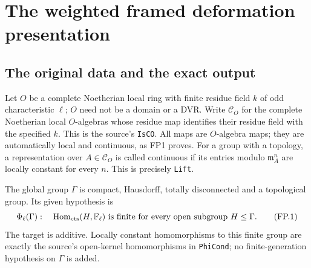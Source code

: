 \section{The weighted framed deformation presentation}
\label{sec:framed-deformation-presentation}


\subsection{The original data and the exact output}

Let $O$ be a complete Noetherian local ring with finite residue field
$k$ of odd characteristic $\ell$; $O$ need not be a domain or a DVR.
Write $\mathcal C_O$ for the complete Noetherian local $O$-algebras
whose residue map identifies their residue field with the specified
$k$.  This is the source's \texttt{IsCO}.  All maps are $O$-algebra
maps; they are automatically local and continuous, as FP1 proves.
For a group with a topology, a representation over $A\in\mathcal C_O$
is called continuous if its entries modulo $\mathfrak m_A^n$ are
locally constant for every $n$.  This is precisely \texttt{Lift}.

The global group $\Gamma$ is compact, Hausdorff, totally disconnected
and a topological group.  Its given hypothesis is
\[
 \Phi_\ell(\Gamma):\quad
 \operatorname{Hom}_{\rm cts}(H,\mathbb F_\ell)
       \text{ is finite for every open subgroup }H\le\Gamma .
 \tag{FP.1}
\]
The target is additive.  Locally constant homomorphisms to this
finite group are exactly the source's open-kernel homomorphisms in
\texttt{PhiCond}; no finite-generation hypothesis on $\Gamma$ is
added.

